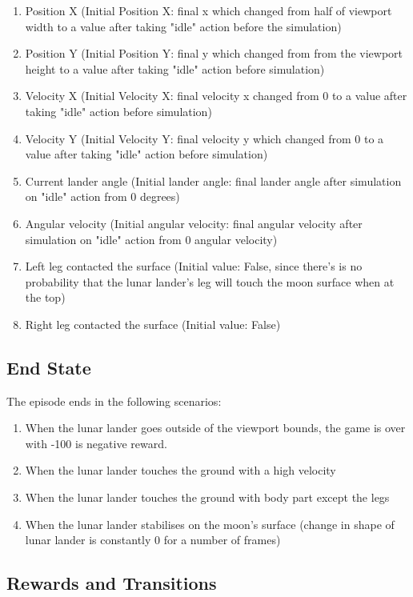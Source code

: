 \documentclass[12pt]{article}
\begin{document}
\begin{enumerate}
\item Position X (Initial Position X: final x which changed from half of viewport width to a value after taking "idle" action before the simulation)
\item Position Y (Initial Position Y: final y which changed from from the viewport height to a value after taking "idle" action before simulation)
\item Velocity X (Initial Velocity X: final velocity x changed from 0 to a value after taking "idle" action before simulation)
\item Velocity Y (Initial Velocity Y: final velocity y which changed from 0 to a value after taking "idle" action before simulation)
\item Current lander angle (Initial lander angle: final lander angle after simulation on "idle" action from 0 degrees)
\item Angular velocity (Initial angular velocity: final angular velocity after simulation on "idle" action from 0 angular velocity)
\item Left leg contacted the surface (Initial value: False, since there's is no probability that the lunar lander's leg will touch the moon surface when at the top)
\item Right leg contacted the surface (Initial value: False)
\end{enumerate}

\subsection{End State}

The episode ends in the following scenarios:

\begin{enumerate}
\item  When the lunar lander goes outside of the viewport bounds, the game is over with -100 is negative reward.
\item  When the lunar lander touches the ground with a high velocity
\item When the lunar lander touches the ground with body part except the legs
\item When the lunar lander stabilises on the moon's surface (change in shape of lunar lander is constantly 0 for a number of frames)
\end{enumerate}

\subsection{Rewards and Transitions}
\end{document}
